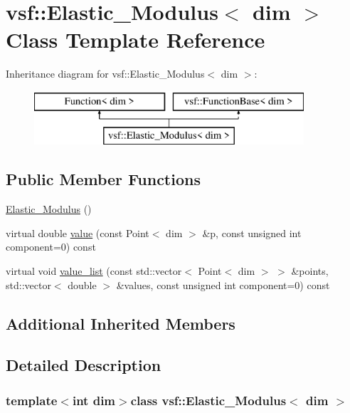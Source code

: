 \hypertarget{classvsf_1_1Elastic__Modulus}{\section{vsf\-:\-:Elastic\-\_\-\-Modulus$<$ dim $>$ Class Template Reference}
\label{classvsf_1_1Elastic__Modulus}
}
Inheritance diagram for vsf\-:\-:Elastic\-\_\-\-Modulus$<$ dim $>$\-:\begin{figure}[H]
\begin{center}
\leavevmode
\includegraphics[height=2.000000cm]{classvsf_1_1Elastic__Modulus}
\end{center}
\end{figure}
\subsection*{Public Member Functions}
\begin{DoxyCompactItemize}
\item 
\hyperlink{classvsf_1_1Elastic__Modulus_a4ef9d26c474d5448aeefa50b05edadeb}{Elastic\-\_\-\-Modulus} ()
\item 
virtual double \hyperlink{classvsf_1_1Elastic__Modulus_a9fc64a88cf8f3d00f7eed85025bf61e2}{value} (const Point$<$ dim $>$ \&p, const unsigned int component=0) const 
\item 
virtual void \hyperlink{classvsf_1_1Elastic__Modulus_a80ff3e43c923615f10db2dd5fcecf7ad}{value\-\_\-list} (const std\-::vector$<$ Point$<$ dim $>$ $>$ \&points, std\-::vector$<$ double $>$ \&values, const unsigned int component=0) const 
\end{DoxyCompactItemize}
\subsection*{Additional Inherited Members}


\subsection{Detailed Description}
\subsubsection*{template$<$int dim$>$class vsf\-::\-Elastic\-\_\-\-Modulus$<$ dim $>$}


